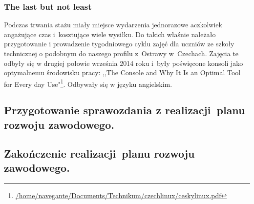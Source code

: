 \documentclass[a4paper,titlepage,13pt,draft]{mwart}
\begin{document}
\begin{flushleft}
\subsubsection{The last but not least}\newline
Podczas trwania stażu miały miejsce wydarzenia jednorazowe aczkolwiek angażujące czas i~kosztujące wiele wysiłku. Do takich właśnie należało przygotowanie i prowadzenie tygodniowego cyklu zajęć dla uczniów ze szkoły technicznej o podobnym do naszego profilu z~Ostrawy w~Czechach. Zajęcia te odbyły się w drugiej połowie września 2014 roku i~były poświęcone konsoli jako optymalnemu środowisku pracy: ,,The Console and Why It Is an Optimal Tool for Every day Use"\footnote{\url{/home/navegante/Documents/Technikum/czechlinux/ceskylinux.pdf}}. Odbywały się w języku angielskim.
\subsection{Przygotowanie sprawozdania z realizacji~planu rozwoju zawodowego.}
\subsection{Zakończenie realizacji~planu rozwoju zawodowego.}
%
\end{flushleft}
\end{document}
